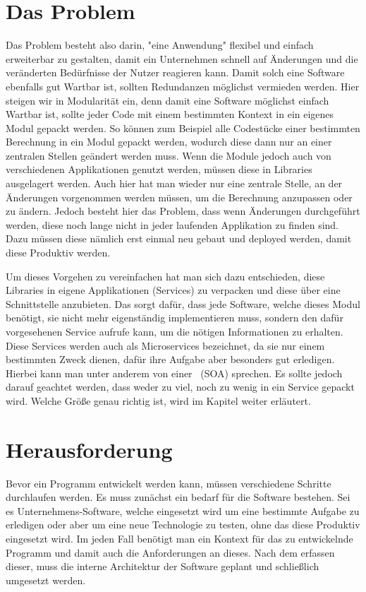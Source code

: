 \section{Das Problem}
Das Problem besteht also darin, "eine Anwendung" flexibel und einfach erweiterbar zu gestalten, damit ein Unternehmen schnell auf Änderungen und die veränderten Bedürfnisse der Nutzer reagieren kann. Damit solch eine Software ebenfalls gut Wartbar ist, sollten Redundanzen möglichst vermieden werden. Hier steigen wir in Modularität ein, denn damit eine Software möglichst einfach Wartbar ist, sollte jeder Code mit einem bestimmten Kontext in ein eigenes Modul gepackt werden. So können zum Beispiel alle Codestücke einer bestimmten Berechnung in ein Modul gepackt werden, wodurch diese dann nur an einer zentralen Stellen geändert werden muss. Wenn die Module jedoch auch von verschiedenen Applikationen genutzt werden, müssen diese in Libraries ausgelagert werden. Auch hier hat man wieder nur eine zentrale Stelle, an der Änderungen vorgenommen werden müssen, um die Berechnung anzupassen oder zu ändern. Jedoch besteht hier das Problem, dass wenn Änderungen durchgeführt werden, diese noch lange nicht in jeder laufenden Applikation zu finden sind. Dazu müssen diese nämlich erst einmal neu gebaut und deployed werden, damit diese Produktiv werden.

Um dieses Vorgehen zu vereinfachen hat man sich dazu entschieden, diese Libraries in eigene Applikationen (Services) zu verpacken und diese über eine Schnittstelle anzubieten. Das sorgt dafür, dass jede Software, welche dieses Modul benötigt, sie nicht mehr eigenständig implementieren muss, sondern den dafür vorgesehenen Service aufrufe kann, um die nötigen Informationen zu erhalten. Diese Services werden auch als Microservices bezeichnet, da sie nur einem bestimmten Zweck dienen, dafür ihre Aufgabe aber besonders gut erledigen. Hierbei kann man unter anderem von einer \SOA\ (SOA) sprechen. Es sollte jedoch darauf geachtet werden, dass weder zu viel, noch zu wenig in ein Service gepackt wird. Welche Größe genau richtig ist, wird im Kapitel  weiter erläutert.

\section{Herausforderung}
Bevor ein Programm entwickelt werden kann, müssen verschiedene Schritte durchlaufen werden. Es muss zunächst ein bedarf für die Software bestehen. Sei es Unternehmens-Software, welche eingesetzt wird um eine bestimmte Aufgabe zu erledigen oder aber um eine neue Technologie zu testen, ohne das diese Produktiv eingesetzt wird. Im jeden Fall benötigt man ein Kontext für das zu entwickelnde Programm und damit auch die Anforderungen an dieses. Nach dem erfassen dieser, muss die interne Architektur der Software geplant und schließlich umgesetzt werden. 

